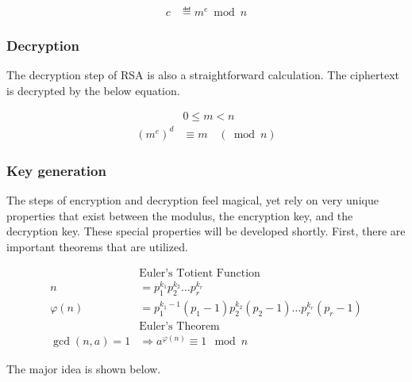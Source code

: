 \documentclass[journal]{IEEEtran}
\begin{document}
\begin{align*}
    c & \eqdef m^{e}\bmod n
\end{align*}

\subsubsection{Decryption}

The decryption step of RSA is also a straightforward calculation. The
ciphertext is decrypted by the below equation.

\begin{align*}
                            & 0\leqslant m< n         \\
    \left( m^{e}\right)^{d} & \equiv m\quad (\bmod n)
\end{align*}

\subsubsection{Key generation}

The steps of encryption and decryption feel magical, yet rely on very unique
properties that exist between the modulus, the encryption key, and the
decryption key. These special properties will be developed shortly. First, there
are important theorems that are utilized.

\begin{align*}
                  & \text{Euler's Totient Function}                                                       \\
    n             & =p_{1}^{k_{1}} p_{2}^{k_{2}} \dotsc p_{r}^{k_{r}}                                     \\
    \varphi ( n)  & =p_{1}^{k_{1} -1}( p_{1} -1) p_{2}^{k_{2}}( p_{2} -1) \dotsc p_{r}^{k_{r}}( p_{r} -1) \\
                  & \text{Euler's Theorem}                                                                \\
    \gcd( n,a) =1 & \Longrightarrow a^{\varphi ( n)} \equiv 1\ \bmod n
\end{align*}

The major idea is shown below.
\end{document}
